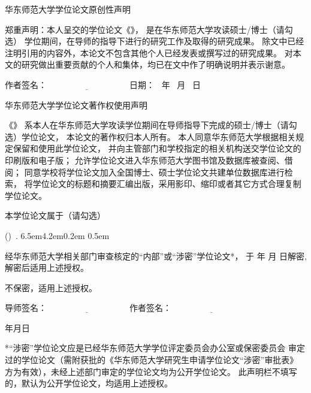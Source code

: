 \thispagestyle{empty}

\vspace*{1em}

{
\linespread{1.4}
\centerline{\STSong 华东师范大学学位论文原创性声明}

\bigskip

郑重声明：本人呈交的学位论文《\cctitle》，
是在华东师范大学攻读硕士/博士（请勾选）
学位期间，在导师的指导下进行的研究工作及取得的研究成果。
除文中已经注明引用的内容外，本论文不包含其他个人已经发表或撰写过的研究成果。
对本文的研究做出重要贡献的个人和集体，均已在文中作了明确说明并表示谢意。

\vspace{1em}


{\STSong 作者签名}：$\underline{\hspace{4cm}}$ \hfill
{\STSong 日\quad 期}： \qquad\ 年 \quad\ 月 \quad\ 日 \qquad\mbox{}

\vspace{4em}

\centerline{\STSong 华东师范大学学位论文著作权使用声明}
\bigskip


《\cctitle》
系本人在华东师范大学攻读学位期间在导师指导下完成的硕士/博士（请勾选）学位论文，
本论文的著作权归本人所有。
本人同意华东师范大学根据相关规定保留和使用此学位论文，
并向主管部门和学校指定的相关机构送交学位论文的印刷版和电子版；
允许学位论文进入华东师范大学图书馆及数据库被查阅、借阅；
同意学校将学位论文加入全国博士、硕士学位论文共建单位数据库进行检索，
将学位论文的标题和摘要汇编出版，采用影印、缩印或者其它方式合理复制学位论文。

本学位论文属于（请勾选）
\begin{list}{{\hfill\upshape (\qquad)\ . }}{%
     \leftmargin6.5em4.2em0.2em
     \itemsep0.5em}

\item 经华东师范大学相关部门审查核定的“内部”或“涉密”学位论文*，
  于 \qquad 年 \quad 月 \quad  日解密, 解密后适用上述授权。

\item 不保密，适用上述授权。
\end{list}

\vskip0.8cm


{\STSong 导师签名}：$\underline{\hspace{4cm}}$ \hfill
{\STSong 作者签名}：$\underline{\hspace{4cm}}$

\bigskip

{\mbox{}\hfill 年\qquad 月\qquad  日 }

\vfill

\parbox[t]{0.946\textwidth}{
*“涉密”学位论文应是已经华东师范大学学位评定委员会办公室或保密委员会
审定过的学位论文（需附获批的《华东师范大学研究生申请学位论文“涉密”审批表》
方为有效），未经上述部门审定的学位论文均为公开学位论文。
此声明栏不填写的，默认为公开学位论文，均适用上述授权。\\
}}
